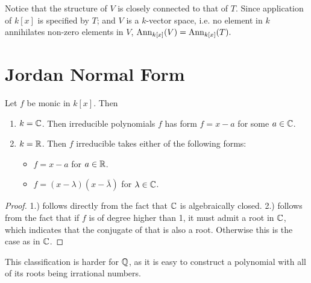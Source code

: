 \begin{remark}
    Notice that the structure of $V$ is closely connected to that of $T$. Since application of $k[x]$ is specified by $T$; and $V$ is a $k$-vector space, i.e. no element in $k$ annihilates non-zero elements in $V$, $\mathrm{Ann}_{k[x]}(V) = \mathrm{Ann}_{k[x]}(T).$
\end{remark}

\section{Jordan Normal Form}

\begin{parenthesis}
    Let $f$ be monic in $k[x]$. Then
    \begin{enumerate}
        \item $k = \mathbb{C}$. Then irreducible polynomials $f$ has form $f = x - a$ for some $a\in \mathbb{C}$. 
        \item $k = \mathbb{R}$. Then $f$ irreducible takes either of the following forms:
            \begin{itemize}
                \item $f = x - a$ for $a\in \mathbb{R}$.
                \item $f = (x - \lambda)(x - \bar{\lambda})$ for $\lambda \in \mathbb{C}$.
            \end{itemize}
    \end{enumerate}
\end{parenthesis}

\begin{proof}
    1.) follows directly from the fact that $\mathbb{C}$ is algebraically closed.  2.) follows from the fact that if $f$ is of degree higher than 1, it must admit a root in $\mathbb{C}$, which indicates that the conjugate of that is also a root. Otherwise this is the case as in $\mathbb{C}$.
\end{proof}

\begin{remark}
    This classification is harder for $\mathbb{Q}$, as it is easy to construct a polynomial with all of its roots being irrational numbers.
\end{remark}

